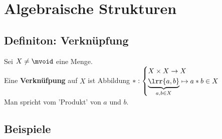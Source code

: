 \chapter{Algebraische Strukturen}
\section{Definiton: Verknüpfung}
	Sei $X\neq\mvoid$ eine Menge.\\
	Eine \textbf{Verknüfpung} auf $X$ ist Abbildung $*:\begin{cases}X\times X \rightarrow X\\\underbrace{\lrr{a,b}}_{a,b\in X}\mapsto a*b\in X\end{cases}$\\
	Man spricht vom 'Produkt' von $a$ und $b$.
\section{Beispiele}
